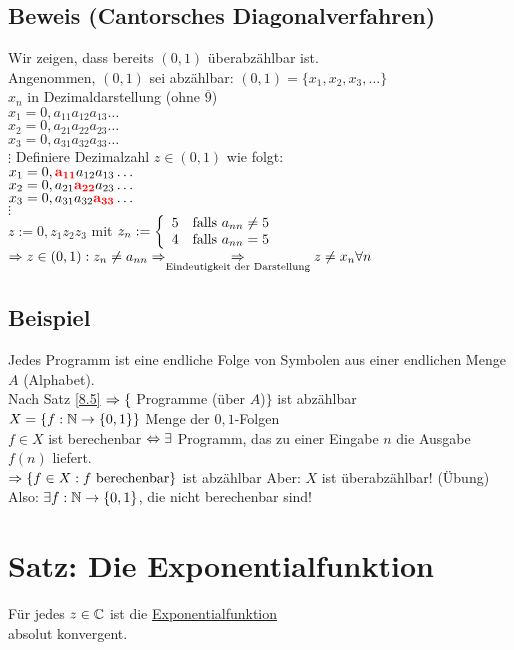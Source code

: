 \subsection*{Beweis (Cantorsches Diagonalverfahren)}
Wir zeigen, dass bereits $(0,1)$ überabzählbar ist.\\
Angenommen, $(0,1)$ sei abzählbar: $(0,1) = \{x_1, x_2, x_3, \ldots\}$\\
$x_n$ in Dezimaldarstellung (ohne $\overline{9}$)\\
$x_1 = 0, a_{11} a_{12} a_{13} \ldots$\\
$x_2 = 0, a_{21} a_{22} a_{23} \ldots$\\
$x_3 = 0, a_{31} a_{32} a_{33} \ldots$\\
$\vdots$\nl
Definiere Dezimalzahl $z \in (0,1)$ wie folgt:\\
$x_1 = 0, {\color{red} \mathbf{a_{11}}} a_{12} a_{13} \ldots$\\
$x_2 = 0, a_{21} {\color{red} \mathbf{a_{22}}} a_{23} \ldots$\\
$x_3 = 0, a_{31} a_{32} {\color{red} \mathbf{a_{33}}} \ldots$\\
$\vdots$\\
$z := 0,z_1 z_2 z_3$ mit $z_n := \left\{ \begin{array}{l l} 5 & \text{falls } a_{nn} \neq 5 \\ 4 & \text{falls } a_{nn} = 5 \end{array} \right.$\\
$\Rightarrow z \in (0,1): z_n \neq a_{nn} \Rightarrow \underset{\text{Eindeutigkeit der Darstellung}}{\Rightarrow} z \neq x_n \forall n$

\subsection*{Beispiel}
Jedes Programm ist eine endliche Folge von Symbolen aus einer endlichen Menge $A$ (Alphabet).\\
Nach Satz \ref{8.5} $\Rightarrow \{$ Programme (über $A$)$\}$ ist abzählbar\\
$X = \{f: \mathbb{N} \to \{0,1\}\}$ Menge der $0,1$-Folgen\\
$f \in X$ ist berechenbar $\Leftrightarrow \exists$ Programm, das zu einer Eingabe $n$ die Ausgabe $f(n)$ liefert.\\
$\Rightarrow \{f \in X: f \text{ berechenbar}\}$ ist abzählbar\nl
Aber: $X$ ist überabzählbar! (Übung)\\
Also: $\exists f: \mathbb{N} \to \{0,1\}$, die nicht berechenbar sind!

\section{Satz: Die Exponentialfunktion}\label{8.8}
Für jedes $z \in \mathbb{C}$ ist die \underline{Exponentialfunktion}\\
 absolut konvergent.

